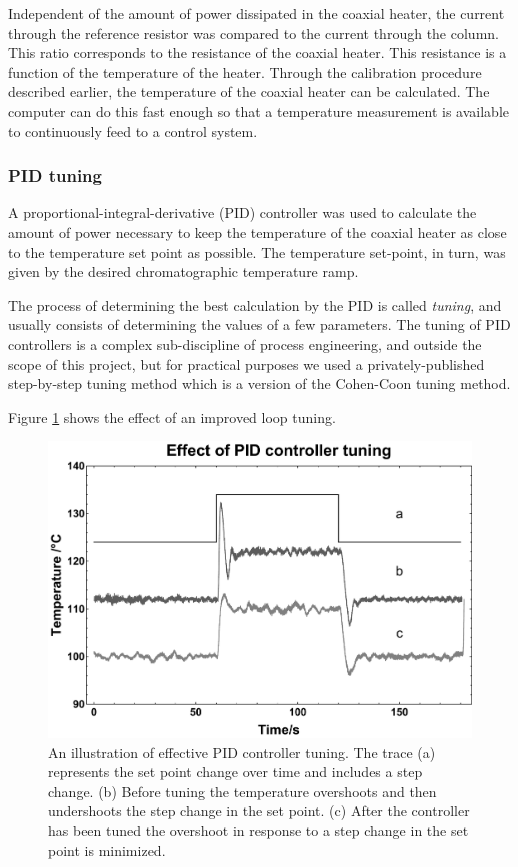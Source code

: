 Independent of the amount of power dissipated in the coaxial heater, the current
through the reference resistor was compared to the current through the column.
This ratio corresponds to the resistance of the coaxial heater. This resistance
is a function of the temperature of the heater. Through the calibration
procedure described earlier, the temperature of the coaxial heater can be
calculated. The computer can do this fast enough so that a temperature
measurement is available to continuously feed to a control system. 

\subsubsection{PID tuning}

A proportional-integral-derivative (PID) controller was used to calculate the
amount of power necessary to keep the temperature of the coaxial heater as close
to the temperature set point as possible. The temperature set-point, in turn,
was given by the desired chromatographic temperature ramp.

The process of determining the best calculation by the PID is called
\textit{tuning}, and usually consists of determining the values of a few
parameters. The tuning of PID controllers is a complex sub-discipline of process
engineering, and outside the scope of this project, but for practical purposes
we used a privately-published step-by-step tuning method \autocite{Peacock2008}
which is a version of the Cohen-Coon tuning method.

Figure \ref{fig:LoopTuning} shows the effect of an improved loop tuning. 

\begin{figure}
	\centering
	\includegraphics[angle=90, origin=c, width=\textwidth]{Figures/LoopTuningGraph.pdf}
	\decoRule	
	\caption[Effect of controller tuning]{An illustration of effective PID
	controller tuning. The trace (a) represents the set point change over time and
	includes a step change. (b) Before tuning the temperature overshoots and then
	undershoots the step change in the set point. (c) After the controller has been
	tuned the overshoot in response to a step change in the set point is minimized. }
	\label{fig:LoopTuning} 
\end{figure}

